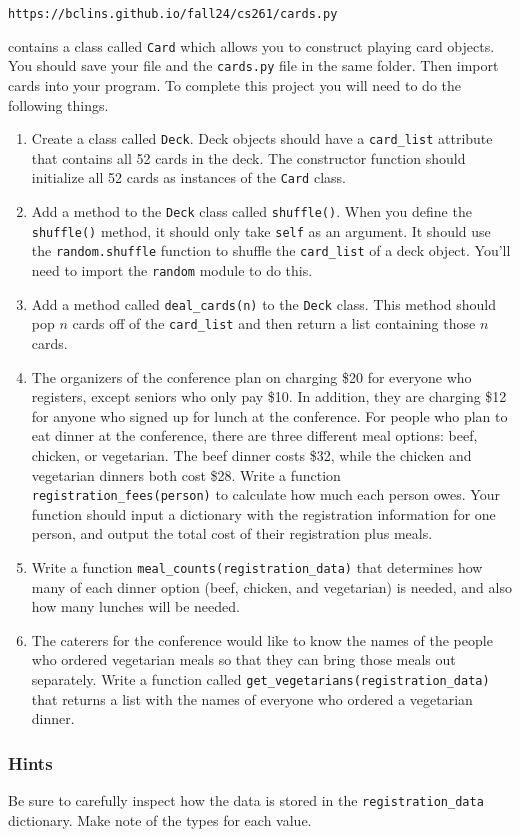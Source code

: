 \documentclass[12pt]{article}
\begin{document}
\begin{center}
\verb|https://bclins.github.io/fall24/cs261/cards.py|
\end{center}

\noindent
contains a class called \verb|Card| which allows you to construct playing card objects.  You should save your file and the \verb|cards.py| file in the same folder.  Then import cards into your program. To complete this project you will need to do the following things.

\begin{enumerate}
\item Create a class called \verb|Deck|. Deck objects should have a \verb|card_list| attribute that contains all 52 cards in the deck.  The constructor function should initialize all 52 cards as instances of the \verb|Card| class. 

\item Add a method to the \verb|Deck| class called \verb|shuffle()|. When you define the \verb|shuffle()| method, it should only take \verb|self| as an argument. It should use the \verb|random.shuffle| function to shuffle the \verb|card_list| of a deck object.  You'll need to import the \verb|random| module to do this. 

\item Add a method called \verb|deal_cards(n)| to the \verb|Deck| class.  This method should pop $n$ cards off of the \verb|card_list| and then return a list containing those $n$ cards.  

\item The organizers of the conference plan on charging \$20 for everyone who registers, except seniors who only pay \$10.  In addition, they are charging \$12 for anyone who signed up for lunch at the conference.  For people who plan to eat dinner at the conference, there are three different meal options: beef, chicken, or vegetarian.  The beef dinner costs \$32, while the chicken and vegetarian dinners both cost \$28. Write a function \verb|registration_fees(person)| to calculate how much each person owes.  Your function should input a dictionary with the registration information for one person, and output the total cost of their registration plus meals. 

\item Write a function \verb|meal_counts(registration_data)| that determines how many of each dinner option (beef, chicken, and vegetarian) is needed, and also how many lunches will be needed. 

\item The caterers for the conference would like to know the names of the people who ordered vegetarian meals so that they can bring those meals out separately.  Write a function called \verb|get_vegetarians(registration_data)| that returns a list with the names of everyone who ordered a vegetarian dinner. 



\end{enumerate}

\subsubsection*{Hints}

Be sure to carefully inspect how the data is stored in the \verb|registration_data| dictionary.  Make note of the types for each value. 
\end{document}
